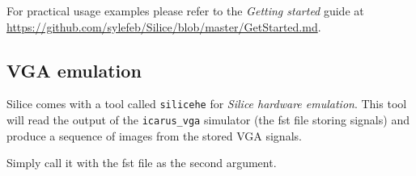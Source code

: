 \documentclass[a4]{article}
\newcommand\silice{Silice}
\begin{document}
For practical usage examples please refer to the \textit{Getting started} guide at \url{https://github.com/sylefeb/Silice/blob/master/GetStarted.md}.

\subsection{VGA emulation}

Silice comes with a tool called \texttt{silicehe} for \textit{\silice{} hardware emulation}. This tool will read the output of the \texttt{icarus\_vga} simulator (the fst file storing signals) and produce a sequence of images from the stored VGA signals.

Simply call it with the fst file as the second argument.

	
\end{document}
